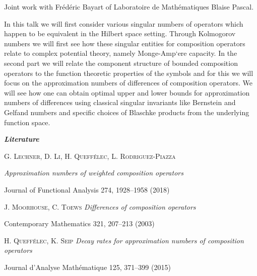 {
    Joint work with Frédéric Bayart of Laboratoire de Mathématiques Blaise Pascal.

    In this talk we will first consider various singular numbers of operators
    which happen to be equivalent in the Hilbert space setting. Through
    Kolmogorov numbers we will first see how these singular entities for
    composition operators relate to complex potential theory, namely
    Monge-Amp`ere capacity. In the second part we will relate the component
    structure of bounded composition operators to the function theoretic
    properties of the symbols and for this we will focus on the approximation
    numbers of differences of composition operators. We will see how one can
    obtain optimal upper and lower bounds for approximation numbers of
    differences using classical singular invariants like Bernstein and
    Gelfand numbers and specific choices of Blaschke products from the
    underlying function space.

    \bigskip
    \noindent
    \textit{\textbf{\large Literature}}

    \medskip
    \textsc{G. Lechner, D. Li, H. Queffélec, L. Rodriguez-Piazza}
    
    \hfill \textit{Approximation numbers of weighted composition operators}

    \hfill Journal of Functional Analysis 274, 1928–1958 (2018)

    \textsc{J. Moorhouse, C. Toews}
    \hfill \textit{Differences of composition operators}

    \hfill Contemporary Mathematics 321, 207–213 (2003)

    \textsc{H. Queffélec, K. Seip}
    \hfill \textit{Decay rates for approximation numbers of composition operators}

    \hfill Journal d’Analyse Mathématique 125, 371–399 (2015)%
}
